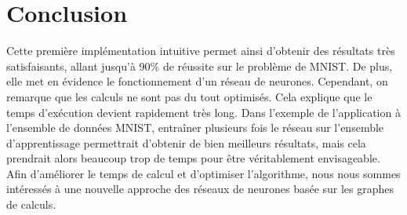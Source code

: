 \section{Conclusion}
Cette première implémentation intuitive permet ainsi d'obtenir des résultats très satisfaisants, allant jusqu'à 90\% de réussite sur le problème de	 MNIST. De plus, elle met en évidence le fonctionnement d'un réseau de neurones. Cependant, on remarque que les calculs ne sont pas du tout optimisés. Cela explique que le temps d'exécution devient rapidement très long. Dans l'exemple de l'application à l'ensemble de données MNIST, entraîner plusieurs fois le réseau sur l'ensemble d'apprentissage permettrait d'obtenir de bien meilleurs résultats, mais cela prendrait alors beaucoup trop de temps pour être véritablement envisageable.
Afin d'améliorer le temps de calcul et d'optimiser l'algorithme, nous nous sommes intéressés à une nouvelle approche des réseaux de neurones basée sur les graphes de calculs.
